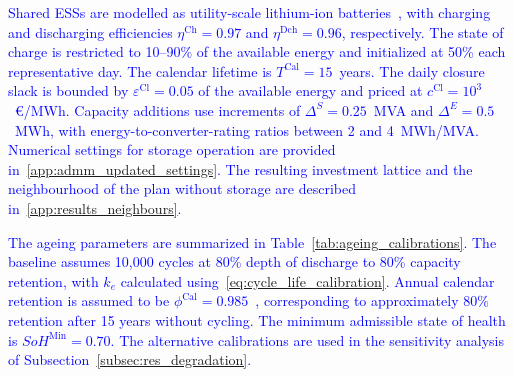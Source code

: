 \documentclass[preprint,12pt]{elsarticle}
\begin{document}
\textcolor{blue}{
    Shared ESSs are modelled as utility-scale lithium-ion batteries~\cite{nrel_ess_costs}, with charging and discharging efficiencies $\eta^{\text{Ch}} = 0.97$ and $\eta^{\text{Dch}} = 0.96$, respectively.
    The state of charge is restricted to 10--90\% of the available energy and initialized at 50\% each representative day. The calendar lifetime is $T^{\text{Cal}} = 15$~years.
    The daily closure slack is bounded by $\varepsilon^{\text{Cl}} = 0.05$ of the available energy and priced at $c^{\text{Cl}} = 10^{3}$~\euro/MWh.
    Capacity additions use increments of $\Delta^S = 0.25$~MVA and $\Delta^E = 0.5$~MWh, with energy-to-converter-rating ratios between 2 and 4~MWh/MVA. Numerical settings for storage operation are provided in~\ref{app:admm_updated_settings}.
}
\textcolor{blue}{
    The resulting investment lattice and the neighbourhood of the plan without storage are described in~\ref{app:results_neighbours}.
}

\textcolor{blue}{
    The ageing parameters are summarized in Table~\ref{tab:ageing_calibrations}.
    The baseline assumes 10{,}000 cycles at 80\% depth of discharge to 80\% capacity retention, with $k_e$ calculated using~\eqref{eq:cycle_life_calibration}. 
    Annual calendar retention is assumed to be $\phi^{\text{Cal}} = 0.985$~\cite{naumann_2018}, corresponding to approximately 80\% retention after 15 years without cycling. The minimum admissible state of health is $SoH^{\text{Min}} = 0.70$.
    The alternative calibrations are used in the sensitivity analysis of Subsection~\ref{subsec:res_degradation}.
}
\end{document}
